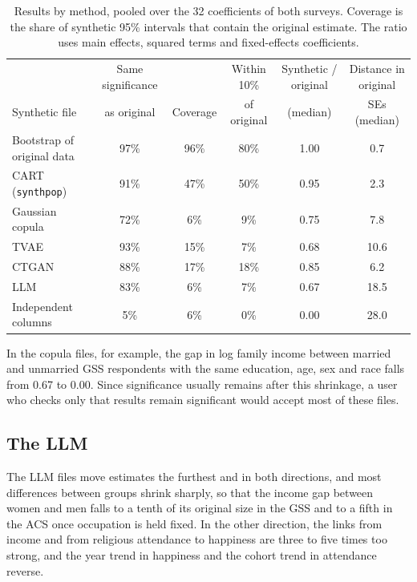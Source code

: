 \documentclass[10pt]{article}
\begin{document}
\begin{table}[H]
\centering\footnotesize
\begin{tabular}{lccccc}
\toprule
 & Same significance & & Within 10\% & Synthetic / original & Distance in original \\
Synthetic file & as original & Coverage & of original & (median) & SEs (median) \\
\midrule
Bootstrap of original data   & 97\% & 96\% & 80\% & 1.00 & 0.7 \\
CART (\texttt{synthpop})     & 91\% & 47\% & 50\% & 0.95 & 2.3 \\
Gaussian copula              & 72\% &  6\% &  9\% & 0.75 & 7.8 \\
TVAE                         & 93\% & 15\% &  7\% & 0.68 & 10.6 \\
CTGAN                        & 88\% & 17\% & 18\% & 0.85 & 6.2 \\
LLM                          & 83\% &  6\% &  7\% & 0.67 & 18.5 \\
Independent columns          &  5\% &  6\% &  0\% & 0.00 & 28.0 \\
\bottomrule
\end{tabular}
\caption{Results by method, pooled over the 32 coefficients of both surveys. Coverage is the
share of synthetic 95\% intervals that contain the original estimate. The ratio uses main effects,
squared terms and fixed-effects coefficients.}
\label{tab:main}
\end{table}

In the copula files, for example, the gap in log family income between married and unmarried GSS
respondents with the same education, age, sex and race falls from 0.67 to 0.00. Since significance usually remains after this shrinkage, a user who
checks only that results remain significant would accept most of these files.

\subsection{The LLM}
The LLM files move estimates the furthest and in both directions, and most differences between groups shrink sharply, so that the income gap between women
and men falls to a tenth of its original size in the GSS and to a fifth in the ACS once occupation is
held fixed. In the other direction, the links from income and from religious attendance to happiness
are three to five times too strong, and the year trend in happiness and the cohort trend in attendance reverse.
\end{document}
